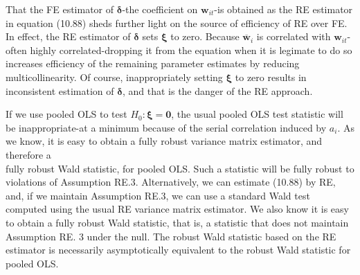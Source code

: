 \documentclass[10pt]{article}
\begin{document}
That the FE estimator of $\boldsymbol{\delta}$-the coefficient on $\mathbf{w}_{i t}$-is obtained as the RE estimator in equation (10.88) sheds further light on the source of efficiency of RE over FE. In effect, the RE estimator of $\boldsymbol{\delta}$ sets $\boldsymbol{\xi}$ to zero. Because $\overline{\mathbf{w}}_{i}$ is correlated with $\mathbf{w}_{i t}$-often highly correlated-dropping it from the equation when it is legimate to do so increases efficiency of the remaining parameter estimates by reducing multicollinearity. Of course, inappropriately setting $\boldsymbol{\xi}$ to zero results in inconsistent estimation of $\boldsymbol{\delta}$, and that is the danger of the RE approach.

If we use pooled OLS to test $H_{0}: \boldsymbol{\xi}=\mathbf{0}$, the usual pooled OLS test statistic will be inappropriate-at a minimum because of the serial correlation induced by $a_{i}$. As we know, it is easy to obtain a fully robust variance matrix estimator, and therefore a\\
fully robust Wald statistic, for pooled OLS. Such a statistic will be fully robust to violations of Assumption RE.3. Alternatively, we can estimate (10.88) by RE, and, if we maintain Assumption RE.3, we can use a standard Wald test computed using the usual RE variance matrix estimator. We also know it is easy to obtain a fully robust Wald statistic, that is, a statistic that does not maintain Assumption RE. 3 under the null. The robust Wald statistic based on the RE estimator is necessarily asymptotically equivalent to the robust Wald statistic for pooled OLS.
\end{document}
